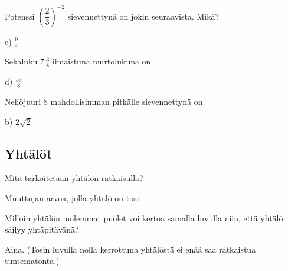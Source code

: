\begin{tehtava}
Potenssi $\left( \dfrac{2}{3} \right)^{-2}$ sievennettynä on jokin seuraavista. Mikä?
\begin{alakohdat}
\end{alakohdat}
\begin{vastaus}
e) $\frac{9}{4}$
\end{vastaus}
\end{tehtava}

\begin{tehtava}
Sekaluku $7\,\frac{3}{8}$ ilmaistuna murtolukuna on
\begin{alakohdat}
\end{alakohdat}
    \begin{vastaus}
	 d) $\frac{59}{8}$
    \end{vastaus}
\end{tehtava}

\begin{tehtava}
Neliöjuuri 8 mahdollisimman pitkälle sievennettynä on
\begin{alakohdat}
\end{alakohdat}

  \begin{vastaus}
	 b) $2\sqrt{2}$
    \end{vastaus}
\end{tehtava}

\subsection*{Yhtälöt}

\begin{tehtava}
Mitä tarkoitetaan yhtälön ratkaisulla?
\begin{vastaus}
Muuttujan arvoa, jolla yhtälö on tosi.
\end{vastaus}
\end{tehtava}

\begin{tehtava}
Milloin yhtälön molemmat puolet voi kertoa samalla luvulla niin, että yhtälö säilyy yhtäpitävänä?
\begin{vastaus}
Aina. (Tosin luvulla nolla kerrottuna yhtälöstä ei enää saa ratkaistua tuntematonta.)
\end{vastaus}
\end{tehtava}

